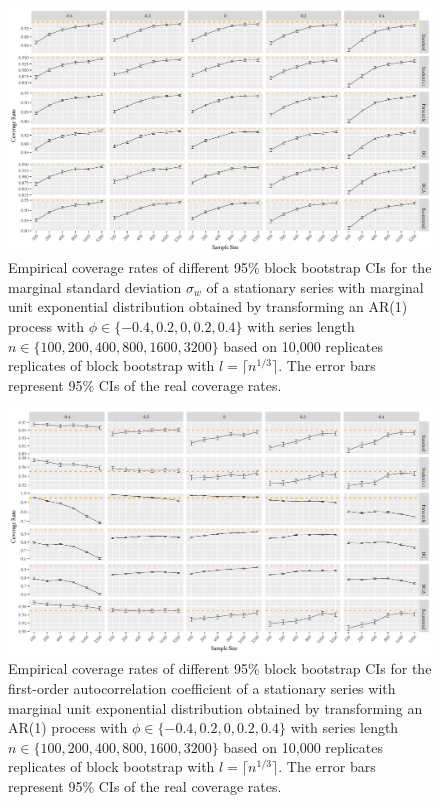 \documentclass[10pt]{article}
\newcommand{\eds}[1]{\textcolor{red}{EDS: (#1)}}
\newcommand{\mc}[1]{\textcolor{orange}{MC: (#1)}}
\begin{document}
\begin{figure}[tbp]
  \centering
  \includegraphics[width=\textwidth]{figures/plot_exp_sigma_1}
  \caption{Empirical coverage rates of different 95\% block bootstrap CIs for
    the marginal standard deviation $\sigma_w$ %
    of a stationary series with 
    marginal unit exponential distribution obtained by transforming an AR(1) process
    with $\phi \in \{-0.4, 0.2, 0, 0.2, 0.4\}$ with series length 
    $n \in \{100, 200, 400, 800, 1600, 3200\}$ based on 10,000 replicates 
    replicates of
    block bootstrap with $l = \lceil n^{1/3} \rceil$. 
    The error bars represent 95\% CIs of the real coverage rates.}
  \label{fig:exp_sigma1}
\end{figure}


\begin{figure}[tbp]
  \centering
  \includegraphics[width=\textwidth]{figures/plot_exp_phi_1}
  \caption{Empirical coverage rates of different 95\% block bootstrap CIs for 
    the first-order autocorrelation coefficient of a stationary series
    with marginal unit exponential distribution obtained by transforming an AR(1) 
    process with 
    $\phi \in \{-0.4, 0.2, 0, 0.2, 0.4\}$ with series length
    $n \in \{100, 200, 400, 800, 1600, 3200\}$ based on 10,000 replicates 
    replicates of
    block bootstrap with $l = \lceil n^{1/3} \rceil$. 
    The error bars represent 95\% CIs of the real coverage rates.}
  \label{fig:exp_phi1}
\end{figure}
\end{document}
